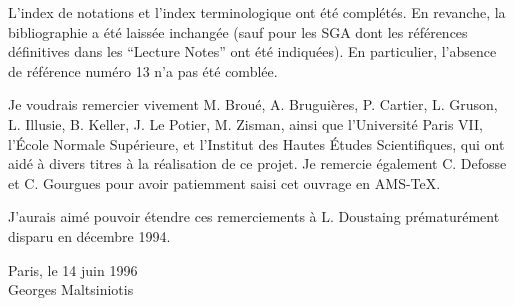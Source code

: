 L'index de notations et l'index terminologique ont été complétés. En revanche,
la bibliographie a été laissée inchangée (sauf pour les SGA dont les références
définitives dans les “Lecture Notes” ont été indiquées). En particulier,
l'absence de référence numéro 13 n'a pas été comblée.

Je voudrais remercier vivement M. Broué, A. Bruguières, P. Cartier, L. Gruson,
L. Illusie, B. Keller, J. Le Potier, M. Zisman, ainsi que l'Université Paris
VII, l'École Normale Supérieure, et l'Institut des Hautes Études Scientifiques,
qui ont aidé à divers titres à la réalisation de ce projet. Je remercie
également C. Defosse et C. Gourgues pour avoir patiemment saisi cet ouvrage en
\textsc{AMS}-\TeX{}.

J'aurais aimé pouvoir étendre ces remerciements à L. Doustaing prématurément
disparu en décembre 1994.

\begin{flushright}
Paris, le 14 juin 1996\\
Georges Maltsiniotis
\end{flushright}

